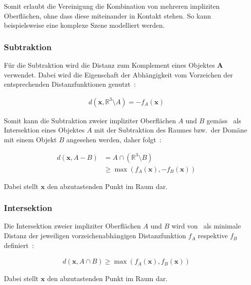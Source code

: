 Somit erlaubt die Vereinigung die Kombination von mehreren impliziten
Oberflächen, ohne dass diese miteinander in Kontakt stehen. So kann
beispielsweise eine komplexe Szene modelliert werden.


\subsubsection{Subtraktion}
\label{ssubsec:implicit_surfaces_ops_subtraction}

Für die Subtraktion wird die Distanz zum Komplement eines Objektes
$\bm{A}$ verwendet. Dabei wird die Eigenschaft der Abhängigkeit vom 
Vorzeichen der entsprechenden Distanzfunktionen genutzt~\parencite[S.
532]{hart_sphere_1994}:

\begin{gather}
    d(\bm{x}, \mathbb{R}^{3} \setminus A) = -f_{A}(\bm{x})
\end{gather}

Somit kann die Subtraktion zweier impliziter Oberflächen $A$ und $B$
gemäss~\citeauthor{hart_sphere_1994} als Intersektion eines Objektes $A$ mit der
Subtraktion des Raumes bzw.\ der Domäne mit einem Objekt $B$ angesehen werden,
daher folgt~\parencite[S. 532]{hart_sphere_1994}:

\begin{align}
    d(\bm{x}, A - B) &= A \cap (\mathbb{R}^{3} \setminus B) \\
                     &\geq \max(f_{A}(\bm{x}), -f_{B}(\bm{x}))
\end{align}

Dabei stellt $\bm{x}$ den abzutastenden Punkt im Raum dar.


\subsubsection{Intersektion}
\label{ssubsec:implicit_surfaces_ops_intersection}

Die Intersektion zweier impliziter Oberflächen $A$ und $B$ wird
von~\cite{hart_sphere_1994} als minimale Distanz der jeweiligen
vorzeichenabhängigen  Distanzfunktion $f_{A}$ respektive $f_{B}$
definiert~\parencite[S. 532]{hart_sphere_1994}:

\begin{gather}
    d(\bm{x}, A \cap B) \geq \max(f_{A}(\bm{x}), f_{B}(\bm{x}))
\end{gather}

Dabei stellt $\bm{x}$ den abzutastenden Punkt im Raum dar.
